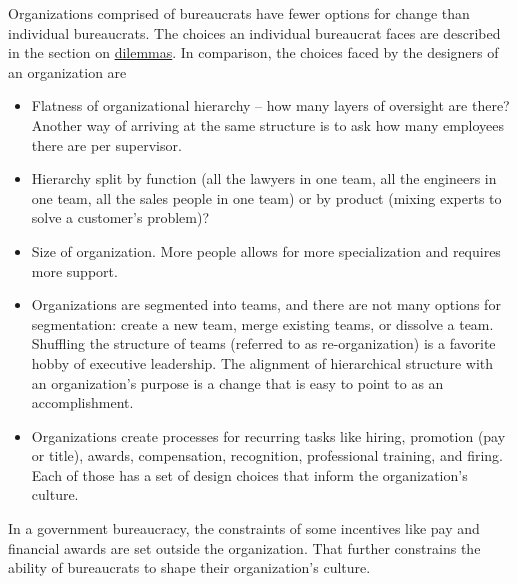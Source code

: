 Organizations comprised of bureaucrats have fewer options for change than individual bureaucrats. The choices an individual bureaucrat faces are described in the section on 
\hyperref[sec:dilemma-trilemma]{dilemmas}.
%
In comparison, the choices faced by the designers of an organization are
\begin{itemize}
    \item Flatness of organizational hierarchy -- how many layers of oversight are there? Another way of arriving at the same structure is to ask how many employees there are per supervisor.
    \item Hierarchy split by function (all the lawyers in one team, all the engineers in one team, all the sales people in one team) or by product (mixing experts to solve a customer's problem)?

    
    \item Size of organization. More people allows for more specialization and requires more support. 
    \item Organizations are segmented into teams, and there are not many options for segmentation: create a new team, merge existing teams, or dissolve a team. Shuffling the structure of teams (referred to as re-organization) is a favorite hobby of executive leadership. The alignment of hierarchical structure with an organization's purpose is a change that is easy to point to as an accomplishment. 

    
    \item Organizations create processes for recurring tasks like hiring, promotion (pay or title), awards, compensation, recognition, professional training, and firing. Each of those has a set of design choices that inform the organization's culture.
\end{itemize}
In a government bureaucracy, the constraints of some incentives like pay and financial awards are set outside the organization. That further constrains the ability of bureaucrats to shape their organization's culture.

